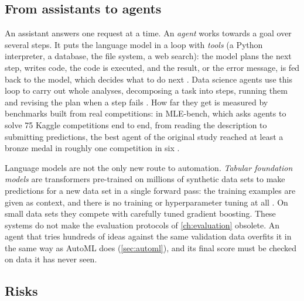 \subsection{From assistants to agents}

An assistant answers one request at a time. An \emph{agent} works towards a goal over several steps. It puts the language model in a loop
with \emph{tools} (a Python interpreter, a database, the file system, a web search): the model plans the next step, writes
code, the code is executed, and the result, or the error message, is fed back to the model, which decides what to do next
\citep{yao2023react}. Data science agents use this loop to carry out whole analyses, decomposing a task into steps,
running them and revising the plan when a step fails \citep{hong2024data}. How far they get is measured by benchmarks built
from real competitions: in MLE-bench, which asks agents to solve 75 Kaggle competitions end to end, from reading the
description to submitting predictions, the best agent of the original study reached at least a bronze medal in roughly one
competition in six \citep{chan2024mlebench}.

Language models are not the only new route to automation. \emph{Tabular foundation models} are transformers pre-trained on
millions of synthetic data sets to make predictions for a new data set in a single forward pass: the training examples are
given as context, and there is no training or hyperparameter tuning at all \citep{hollmann2023tabpfn,hollmann2025accurate}. On
small data sets they compete with carefully tuned gradient boosting. These systems do not make the evaluation protocols of
\cref{ch:evaluation} obsolete. An agent that tries hundreds of ideas against the same validation data overfits it in the same way as
AutoML does (\cref{sec:automl}), and its final score must be checked on data it has never seen.

\subsection{Risks}

